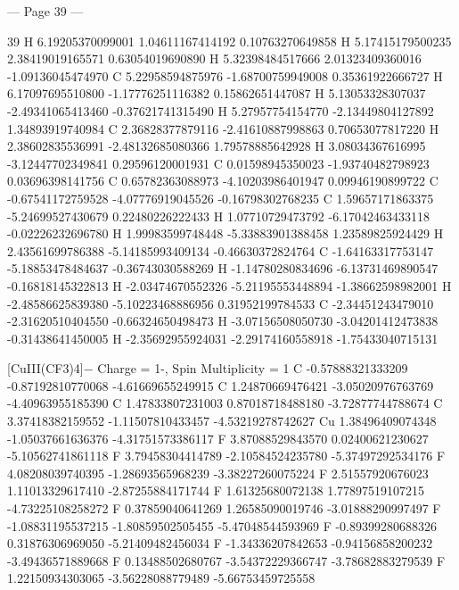 --- Page 39 ---
 
39 
  H   6.19205370099001      1.04611167414192      0.10763270649858 
  H   5.17415179500235      2.38419019165571      0.63054019690890 
  H   5.32398484517666      2.01323409360016     -1.09136045474970 
  C   5.22958594875976     -1.68700759949008      0.35361922666727 
  H   6.17097695510800     -1.17776251116382      0.15862651447087 
  H   5.13053328307037     -2.49341065413460     -0.37621741315490 
  H   5.27957754154770     -2.13449804127892      1.34893919740984 
  C   2.36828377879116     -2.41610887998863      0.70653077817220 
  H   2.38602835536991     -2.48132685080366      1.79578885642928 
  H   3.08034367616995     -3.12447702349841      0.29596120001931 
  C   0.01598945350023     -1.93740482798923      0.03696398141756 
  C   0.65782363088973     -4.10203986401947      0.09946190899722 
  C   -0.67541172759528     -4.07776919045526     -0.16798302768235 
  C   1.59657171863375     -5.24699527430679      0.22480226222433 
  H   1.07710729473792     -6.17042463433118     -0.02226232696780 
  H   1.99983599748448     -5.33883901388458      1.23589825924429 
  H   2.43561699786388     -5.14185993409134     -0.46630372824764 
  C   -1.64163317753147     -5.18853478484637     -0.36743030588269 
  H   -1.14780280834696     -6.13731469890547     -0.16818145322813 
  H   -2.03474670552326     -5.21195553448894     -1.38662598982001 
  H   -2.48586625839380     -5.10223468886956      0.31952199784533 
  C   -2.34451243479010     -2.31620510404550     -0.66324650498473 
  H   -3.07156508050730     -3.04201412473838     -0.31438641450005 
  H   -2.35692955924031     -2.29174160558918     -1.75433040715131 
 
[CuIII(CF3)4]− 
Charge = 1-, Spin Multiplicity = 1 
  C   -0.57888321333209     -0.87192810770068     -4.61669655249915 
  C   1.24870669476421     -3.05020976763769     -4.40963955185390 
  C   1.47833807231003      0.87018718488180     -3.72877744788674 
  C   3.37418382159552     -1.11507810433457     -4.53219278742627 
  Cu  1.38496409074348     -1.05037661636376     -4.31751573386117 
  F   3.87088529843570      0.02400621230627     -5.10562741861118 
  F   3.79458304414789     -2.10584524235780     -5.37497292534176 
  F   4.08208039740395     -1.28693565968239     -3.38227260075224 
  F   2.51557920676023      1.11013329617410     -2.87255884171744 
  F   1.61325680072138      1.77897519107215     -4.73225108258272 
  F   0.37859040641269      1.26585090019746     -3.01888290997497 
  F   -1.08831195537215     -1.80859502505455     -5.47048544593969 
  F   -0.89399280688326      0.31876306969050     -5.21409482456034 
  F   -1.34336207842653     -0.94156858200232     -3.49436571889668 
  F   0.13488502680767     -3.54372229366747     -3.78682883279539 
  F   1.22150934303065     -3.56228088779489     -5.66753459725558 


